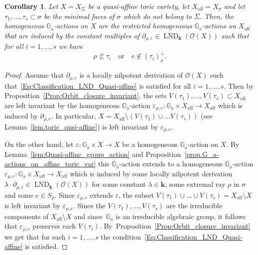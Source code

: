 \documentclass[11pt]{article}
\numberwithin{equation}{section}
\let\mathcal\mathscr
\newcommand{\ra}{\mathrm{a}}
\let\oldbot\bot
\renewcommand{\bot}{{\scriptscriptstyle\oldbot}}
\theoremstyle{plain}
\newtheorem{corollary}[theorem]{Corollary}
\theoremstyle{definition}
\DeclareMathOperator{\aff}{aff}
\DeclareMathOperator{\LND}{LND}
\newcommand{\OO}{\mathcal{O}}
\newcommand{\GG}{\mathbb{G}}
\newcommand{\kk}{{\boldsymbol{k}}}
\begin{document}
\begin{corollary}
\label{Cor:Classification_LND_Quasi-affine}
Let $X = X_{\Sigma}$ be a quasi-affine toric variety, let $X_{\aff} = X_\sigma$ and let $\tau_1, \ldots, \tau_s \subset \sigma$
be the minimal faces of $\sigma$ which do not belong to $\Sigma$. Then, the homogeneous
$\GG_\ra$-actions on $X$ are the restricted homogeneous $\GG_\ra$-actions on $X_{\aff}$ that
are induced by the constant multiples of $\partial_{\rho, e} \in \LND_{\kk}(\OO(X))$
such that
for all $i = 1, \ldots, s$ we have
\[
\label{Eq:Classification_LND_Quasi-affine}
\tag{$\circledast$}
\rho \not\subset \tau_i \quad \textrm{or} \quad e \not\in (\tau_i)_{\rho}^\bot.
\]
\end{corollary}

\begin{proof}
Assume that $\partial_{\rho, e}$ is a locally nilpotent derivation of $\OO(X)$
such that~\eqref{Eq:Classification_LND_Quasi-affine} is satisfied for all $i =1, \ldots, s$.
Then by Proposition~\ref{Prop:Orbit_closure_invariant}, the sets $V(\tau_1), \ldots, V(\tau_s) \subset X_{\aff}$
are left invariant by the homogeneous $\GG_\ra$-action
$\varepsilon_{\rho, e} \colon \GG_\ra \times X_{\aff} \to X_{\aff}$
which is induced by $\partial_{\rho, e}$.
In particular, $X = X_{\aff} \setminus (V(\tau_1) \cup \ldots V(\tau_s))$ (see Lemma~\ref{lem.toric_qusi-affine}) is left
invariant by $\varepsilon_{\rho, e}$.

On the other hand, let $\varepsilon \colon \GG_\ra \times X \to X$ be a homogeneous $\GG_\ra$-action on $X$.
By Lemma~\ref{lem:Quasi-affine_group_action} and Proposition~\ref{prop.G_a-actions_on_affine_toric_var}
this $\GG_\ra$-action extends to a homogeneous $\GG_\ra$-action
$\varepsilon_{\rho, e} \colon \GG_\ra \times X_{\aff} \to X_{\aff}$ which is induced
by some locally nilpotent derivation $\lambda \cdot \partial_{\rho, e} \in \LND_{\kk}(\OO(X))$ for some
constant $\lambda \in \kk$, some
extremal ray $\rho$ in $\sigma$ and some $e \in S_{\rho}$. Since $\varepsilon_{\rho, e}$ extends
$\varepsilon$, the subset $V(\tau_1) \cup \ldots \cup V(\tau_s) = X_{\aff} \setminus X$ is left
invariant by $\varepsilon_{\rho, e}$. Since the $V(\tau_1), \ldots, V(\tau_s)$ are the
irreducible components of $X_{\aff} \setminus X$ and since~$\GG_\ra$ is an irreducible algebraic group, it follows that $\varepsilon_{\rho, e}$ preserves each $V(\tau_i)$.
By~Proposition~\ref{Prop:Orbit_closure_invariant} we get that for each $i=1, \ldots, s$
the condition~\eqref{Eq:Classification_LND_Quasi-affine} is satisfied.
\end{proof}
\end{document}
